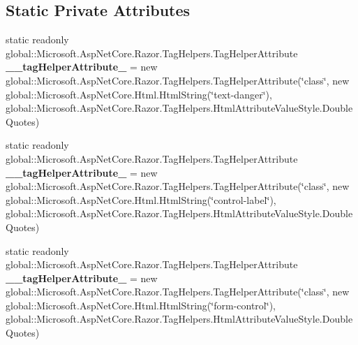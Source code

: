 \subsection*{Static Private Attributes}
\begin{DoxyCompactItemize}
\item 
\mbox{\label{class_asp_net_core_1_1_views___items___create_a6179a761b6d10c4a35be1d8dfd49a06b}} 
static readonly global\+::\+Microsoft.\+Asp\+Net\+Core.\+Razor.\+Tag\+Helpers.\+Tag\+Helper\+Attribute {\bfseries \+\_\+\+\_\+tag\+Helper\+Attribute\+\_} = new global\+::\+Microsoft.\+Asp\+Net\+Core.\+Razor.\+Tag\+Helpers.\+Tag\+Helper\+Attribute(\char`\"{}class\char`\"{}, new global\+::\+Microsoft.\+Asp\+Net\+Core.\+Html.\+Html\+String(\char`\"{}text-\/danger\char`\"{}), global\+::\+Microsoft.\+Asp\+Net\+Core.\+Razor.\+Tag\+Helpers.\+Html\+Attribute\+Value\+Style.\+Double\+Quotes)
\item 
\mbox{\label{class_asp_net_core_1_1_views___items___create_a429a43c0c465f5fc046fbff1707fc1d3}} 
static readonly global\+::\+Microsoft.\+Asp\+Net\+Core.\+Razor.\+Tag\+Helpers.\+Tag\+Helper\+Attribute {\bfseries \+\_\+\+\_\+tag\+Helper\+Attribute\+\_} = new global\+::\+Microsoft.\+Asp\+Net\+Core.\+Razor.\+Tag\+Helpers.\+Tag\+Helper\+Attribute(\char`\"{}class\char`\"{}, new global\+::\+Microsoft.\+Asp\+Net\+Core.\+Html.\+Html\+String(\char`\"{}control-\/label\char`\"{}), global\+::\+Microsoft.\+Asp\+Net\+Core.\+Razor.\+Tag\+Helpers.\+Html\+Attribute\+Value\+Style.\+Double\+Quotes)
\item 
\mbox{\label{class_asp_net_core_1_1_views___items___create_a9b5a1d8dfceb6da9742f72fae49cd0a7}} 
static readonly global\+::\+Microsoft.\+Asp\+Net\+Core.\+Razor.\+Tag\+Helpers.\+Tag\+Helper\+Attribute {\bfseries \+\_\+\+\_\+tag\+Helper\+Attribute\+\_} = new global\+::\+Microsoft.\+Asp\+Net\+Core.\+Razor.\+Tag\+Helpers.\+Tag\+Helper\+Attribute(\char`\"{}class\char`\"{}, new global\+::\+Microsoft.\+Asp\+Net\+Core.\+Html.\+Html\+String(\char`\"{}form-\/control\char`\"{}), global\+::\+Microsoft.\+Asp\+Net\+Core.\+Razor.\+Tag\+Helpers.\+Html\+Attribute\+Value\+Style.\+Double\+Quotes)
\item 
\mbox{\label{class_asp_net_core_1_1_views___items___create_a5cf091dd63f7ff8b811cc32684effddd}} 

\end{DoxyCompactItemize}
